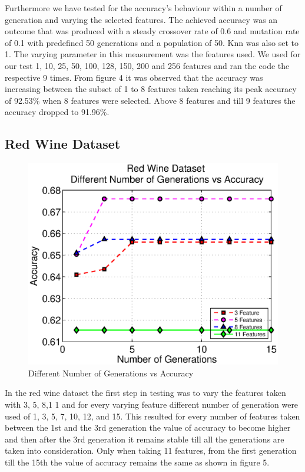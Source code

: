 \documentclass[11pt,onecolumn,a4paper]{article}
\begin{document}
    
    
    
    Furthermore we have tested for the accuracy's behaviour within a number of generation and varying the selected features. The achieved accuracy was an outcome that was produced with a steady crossover rate of 0.6 and mutation rate of 0.1 with predefined 50 generations and a population of 50. Knn was also set to 1. The varying parameter in this measurement was the features used. We used for our test 1, 10, 25, 50, 100, 128, 150, 200 and 256 features and ran the code the respective 9 times. From figure 4 it was observed that the accuracy was increasing between the subset of 1 to 8 features taken reaching its peak accuracy of 92.53\% when 8 features were selected. Above 8 features and till 9 features the accuracy dropped to 91.96\%.    

\subsection{Red Wine Dataset }

  \begin{figure}[h!]
      \centering
      \includegraphics[width=0.6\linewidth]{img/winefeat.eps}
      \caption{Different Number of Generations vs Accuracy}
   \end{figure}
 In the red wine dataset the first step in testing was to vary the features taken with 3, 5, 8,1 1 and for every varying  feature different number of generation were used of 1, 3, 5, 7, 10, 12, and 15. This resulted for every number of features taken between the 1st and the 3rd generation the value of accuracy to become higher and then after the 3rd generation it remains stable till all the generations are taken into consideration. Only when taking 11 features, from the first generation till the 15th the value of accuracy remains the same as shown in figure 5.    
   
\end{document}
